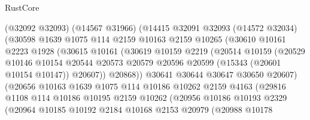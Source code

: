 \begin{lexlean}{RustCore}
\begin{coremodule}
                      (@32092 @32093)
                      (@14567 @31966)
                      (@14415
                        @32091
                        @32093
                        (@14572 @32034)
                        (@30598
                          @1639
                          @1075
                          @114
                          @2159
                          @10163
                          @2159
                          @10265
                          (@30610
                            @10161
                            @2223
                            @1928
                            (@30615
                              @10161
                              (@30619
                                @10159
                                @2219
                                (@20514
                                  @10159
                                  (@20529
                                    @10146
                                    @10154
                                    @20544
                                    @20573
                                    @20579
                                    @20596
                                    @20599
                                    (@15343 (@20601 @10154 @10147))
                                    @20607))
                                @20868))
                            @30641
                            @30644
                            @30647
                            @30650
                            @20607)
                          (@20656
                            @10163
                            @1639
                            @1075
                            @114
                            @10186
                            @10262
                            @2159
                            @4163
                            (@29816
                              @1108
                              @114
                              @10186
                              @10195
                              @2159
                              @10262
                              (@20956
                                @10186
                                @10193
                                @2329
                                (@20964
                                  @10185
                                  @10192
                                  @2184
                                  @10168
                                  @2153
                                  @20979
                                  (@20988
                                    @10178

\end{coremodule}
\end{lexlean}
